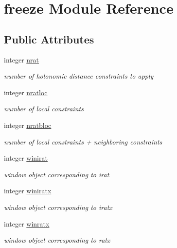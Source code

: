 \hypertarget{classfreeze}{\section{freeze Module Reference}
\label{classfreeze}
}
\subsection*{Public Attributes}
\begin{DoxyCompactItemize}
\item 
integer \hyperlink{classfreeze_a9e857107771fcd2a9f3daebff0b73e98}{nrat}
\begin{DoxyCompactList}\small\item\em number of holonomic distance constraints to apply \end{DoxyCompactList}\item 
integer \hyperlink{classfreeze_ad3fc5db048f9d03dbe422ebd1c656f40}{nratloc}
\begin{DoxyCompactList}\small\item\em number of local constraints \end{DoxyCompactList}\item 
integer \hyperlink{classfreeze_a1afad11947f026c8f2d2203203f4adf5}{nratbloc}
\begin{DoxyCompactList}\small\item\em number of local constraints + neighboring constraints \end{DoxyCompactList}\item 
integer \hyperlink{classfreeze_af6cca7e43f620ad05cae4791a3217687}{winirat}
\begin{DoxyCompactList}\small\item\em window object corresponding to irat \end{DoxyCompactList}\item 
integer \hyperlink{classfreeze_ab2fccc00f356918f860e43c2d1ce75d1}{winiratx}
\begin{DoxyCompactList}\small\item\em window object corresponding to iratx \end{DoxyCompactList}\item 
integer \hyperlink{classfreeze_aa3149a0168a82518be41d200192edcdb}{winratx}
\begin{DoxyCompactList}\small\item\em window object corresponding to ratx \end{DoxyCompactList}\item 

\end{DoxyCompactItemize}
